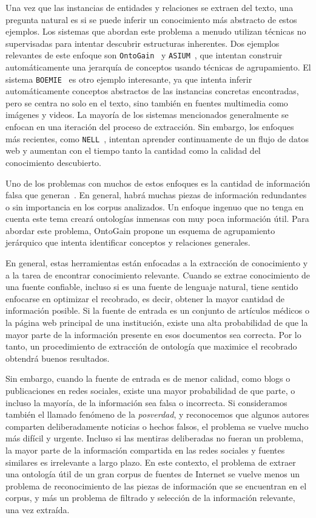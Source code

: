 Una vez que las instancias de entidades y relaciones se extraen del texto, una pregunta natural es si se puede inferir un conocimiento más abstracto de estos ejemplos.
Los sistemas que abordan este problema a menudo utilizan técnicas no supervisadas para intentar descubrir estructuras inherentes.
Dos ejemplos relevantes de este enfoque son \texttt{OntoGain}~\cite{drymonas2010unsupervised} y \texttt{ASIUM}~\cite{asium}, que intentan construir automáticamente una jerarquía de conceptos usando técnicas de agrupamiento.
El sistema \texttt{BOEMIE}~\cite{boemie} es otro ejemplo interesante, ya que intenta inferir automáticamente conceptos abstractos de las instancias concretas encontradas, pero se centra no solo en el texto, sino también en fuentes multimedia como imágenes y videos.
La mayoría de los sistemas mencionados generalmente se enfocan en una iteración del proceso de extracción.
Sin embargo, los enfoques más recientes, como \texttt{NELL}~\cite{mitchell2015never}, intentan aprender continuamente de un flujo de datos web y aumentan con el tiempo tanto la cantidad como la calidad del conocimiento descubierto.

Uno de los problemas con muchos de estos enfoques es la cantidad de información falsa que generan~\cite{Maimon:2015:OLT:2870689.2870690}.
En general, habrá muchas piezas de información redundantes o sin importancia en los corpus analizados.
Un enfoque ingenuo que no tenga en cuenta este tema creará ontologías inmensas con muy poca información útil.
Para abordar este problema, OntoGain propone un esquema de agrupamiento jerárquico que intenta identificar conceptos y relaciones generales.

En general, estas herramientas están enfocadas a la extracción de conocimiento y a la tarea de encontrar conocimiento relevante.
Cuando se extrae conocimiento de una fuente confiable, incluso si es una fuente de lenguaje natural, tiene sentido enfocarse en optimizar el recobrado, es decir, obtener la mayor cantidad de información posible.
Si la fuente de entrada es un conjunto de artículos médicos o la página web principal de una institución, existe una alta probabilidad de que la mayor parte de la información presente en esos documentos sea correcta.
Por lo tanto, un procedimiento de extracción de ontología que maximice el recobrado obtendrá buenos resultados.

Sin embargo, cuando la fuente de entrada es de menor calidad, como blogs o publicaciones en redes sociales, existe una mayor probabilidad de que parte, o incluso la mayoría, de la información sea falsa o incorrecta.
Si consideramos también el llamado fenómeno de la \textit{posverdad}, y reconocemos que algunos autores comparten deliberadamente noticias o hechos falsos, el problema se vuelve mucho más difícil y urgente.
Incluso si las mentiras deliberadas no fueran un problema, la mayor parte de la información compartida en las redes sociales y fuentes similares es irrelevante a largo plazo.
En este contexto, el problema de extraer una ontología útil de un gran corpus de fuentes de Internet se vuelve menos un problema de reconocimiento de las piezas de información que se encuentran en el corpus, y más un problema de filtrado y selección de la información relevante, una vez extraída.

